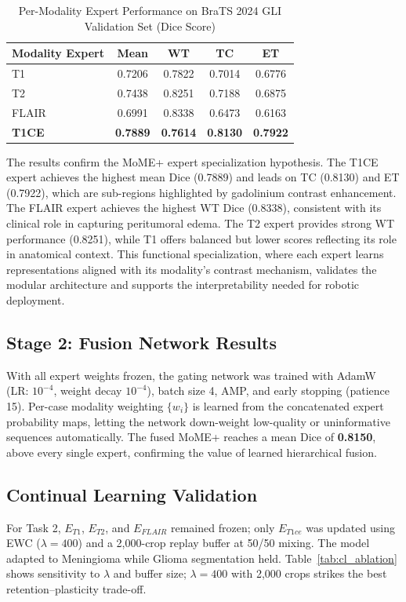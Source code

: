 \documentclass[conference]{IEEEtran}
\begin{document}
\begin{table}[htbp]
\caption{Per-Modality Expert Performance on BraTS 2024 GLI Validation Set (Dice Score)}
\begin{center}
\begin{tabular}{l c c c c}
\toprule
\textbf{Modality Expert} & \textbf{Mean} & \textbf{WT} & \textbf{TC} & \textbf{ET} \\
\midrule
T1     & 0.7206 & 0.7822 & 0.7014 & 0.6776 \\
T2     & 0.7438 & 0.8251 & 0.7188 & 0.6875 \\
FLAIR  & 0.6991 & 0.8338 & 0.6473 & 0.6163 \\
\textbf{T1CE} & \textbf{0.7889} & \textbf{0.7614} & \textbf{0.8130} & \textbf{0.7922} \\
\bottomrule
\end{tabular}
\label{tab:modality_results}
\end{center}
\end{table}

The results confirm the MoME+ expert specialization hypothesis. The T1CE expert achieves the highest mean Dice (0.7889) and leads on TC (0.8130) and ET (0.7922), which are sub-regions highlighted by gadolinium contrast enhancement. The FLAIR expert achieves the highest WT Dice (0.8338), consistent with its clinical role in capturing peritumoral edema. The T2 expert provides strong WT performance (0.8251), while T1 offers balanced but lower scores reflecting its role in anatomical context. This functional specialization, where each expert learns representations aligned with its modality's contrast mechanism, validates the modular architecture and supports the interpretability needed for robotic deployment.

\subsection{Stage 2: Fusion Network Results}
With all expert weights frozen, the gating network was trained with AdamW (LR: $10^{-4}$, weight decay $10^{-4}$), batch size 4, AMP, and early stopping (patience 15). Per-case modality weighting $\{w_i\}$ is learned from the concatenated expert probability maps, letting the network down-weight low-quality or uninformative sequences automatically. The fused MoME+ reaches a mean Dice of \textbf{0.8150}, above every single expert, confirming the value of learned hierarchical fusion.

\subsection{Continual Learning Validation}
For Task 2, $E_{T1}$, $E_{T2}$, and $E_{FLAIR}$ remained frozen; only $E_{T1ce}$ was updated using EWC ($\lambda = 400$) and a 2,000-crop replay buffer at 50/50 mixing. The model adapted to Meningioma while Glioma segmentation held. Table~\ref{tab:cl_ablation} shows sensitivity to $\lambda$ and buffer size; $\lambda=400$ with 2,000 crops strikes the best retention--plasticity trade-off.
\end{document}
